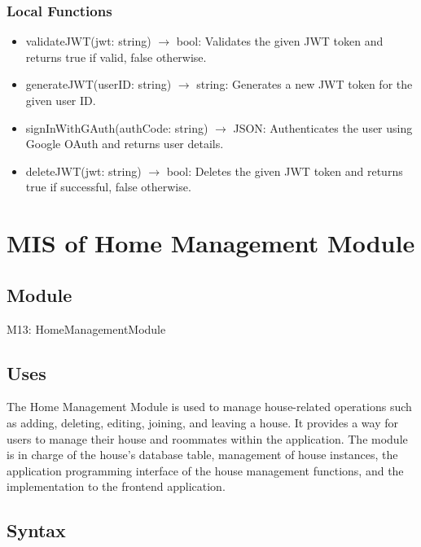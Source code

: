\documentclass[12pt, titlepage]{article}
\begin{document}
\subsubsection{Local Functions}

\begin{itemize}
  \item validateJWT(jwt: string) $\rightarrow$ bool: Validates the given JWT token and returns true if valid, false otherwise.
  \item generateJWT(userID: string) $\rightarrow$ string: Generates a new JWT token for the given user ID.
  \item signInWithGAuth(authCode: string) $\rightarrow$ JSON: Authenticates the user using Google OAuth and returns user details.
  \item deleteJWT(jwt: string) $\rightarrow$ bool: Deletes the given JWT token and returns true if successful, false otherwise.
\end{itemize}

\newpage


\section{MIS of Home Management Module} \label{Module} 

\subsection{Module}

M13: HomeManagementModule

\subsection{Uses}

The Home Management Module is used to manage house-related operations such as adding, deleting, editing, joining, and leaving a house. It provides a way for users to manage their house and roommates within the application. The module is in charge of the house's database table, management of house instances, the application programming interface of the house management functions, and the implementation to the frontend application.

\subsection{Syntax}
\end{document}
